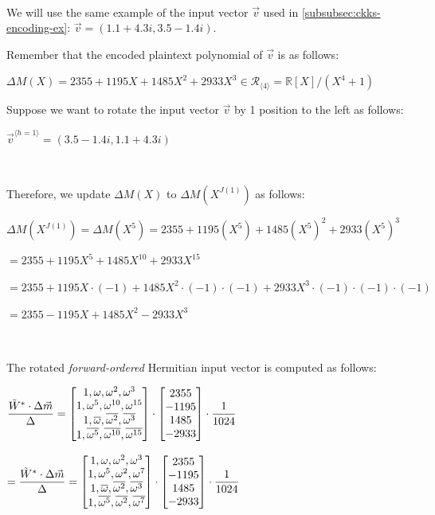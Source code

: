 $ $

We will use the same example of the input vector $\vec{v}$ used in \autoref{subsubsec:ckks-encoding-ex}: $\vec{v} = (1.1 + 4.3i, 3.5 - 1.4i)$.

Remember that the encoded plaintext polynomial of $\vec{v}$ is as follows:

$\Delta M(X) = 2355 + 1195X + 1485X^2 + 2933X^3 \in \mathcal{R}_{\langle 4 \rangle}=\mathbb{R}[X]/(X^4+1)$


Suppose we want to rotate the input vector $\vec{v}$ by 1 position to the left as follows:

$\vec{v}^{\langle h=1 \rangle} = (3.5 - 1.4i, 1.1 + 4.3i)$

$ $

Therefore, we update $\Delta M(X)$ to $\Delta M(X^{J(1)})$ as follows:

$\Delta M(X^{J(1)}) = \Delta M(X^{5}) = 2355 + 1195(X^5) + 1485(X^5)^2 + 2933(X^5)^3$

$= 2355 + 1195X^5 + 1485X^{10} + 2933X^{15}$

$= 2355 + 1195X\cdot(-1) + 1485X^{2}\cdot(-1)\cdot(-1) + 2933X^{3}\cdot(-1)\cdot(-1)\cdot(-1)$

$= 2355 - 1195X + 1485X^2 - 2933X^3$

$ $

The rotated \textit{forward-ordered} Hermitian input vector is computed as follows:

$\dfrac{\tilde W^* \cdot \Delta \vec{m}}{\Delta} = \begin{bmatrix}
1,\omega,\omega^2, \omega^3\\
1,\omega^5, \omega^{10},\omega^{15}\\
1,\overline{\omega}, \overline{\omega^2}, \overline{\omega^3}\\
1,\overline{\omega^5}, \overline{\omega^{10}}, \overline{\omega^{15}}
\end{bmatrix} \cdot \begin{bmatrix}
2355\\- 1195\\1485\\-2933
\end{bmatrix}\cdot \dfrac{1}{1024}$

$= \dfrac{\tilde W^* \cdot \Delta \vec{m}}{\Delta} = \begin{bmatrix}
1,\omega,\omega^2, \omega^3\\
1,\omega^5, \omega^{2},\omega^{7}\\
1,\overline{\omega}, \overline{\omega^2}, \overline{\omega^3}\\
1,\overline{\omega^5}, \overline{\omega^{2}}, \overline{\omega^{7}}
\end{bmatrix} \cdot \begin{bmatrix}
2355\\- 1195\\1485\\-2933
\end{bmatrix}\cdot \dfrac{1}{1024}$

